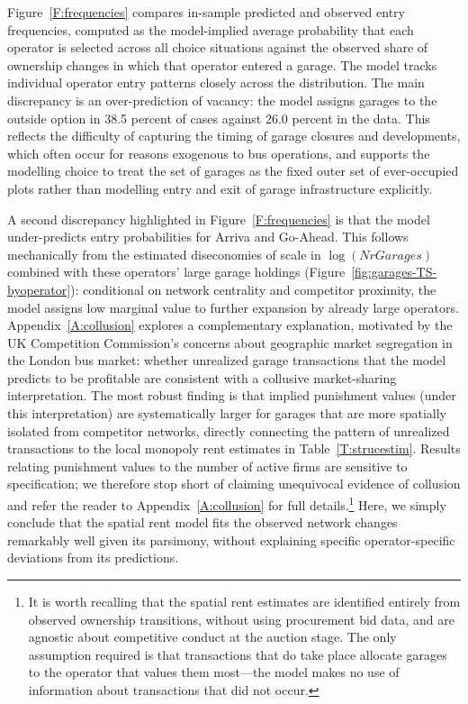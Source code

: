 \documentclass[12pt]{article}
\begin{document}
Figure~\ref{F:frequencies} compares in-sample predicted and observed entry 
frequencies, computed as the model-implied average probability that each 
operator is selected across all choice situations against the observed share 
of ownership changes in which that operator entered a garage. The model 
tracks individual operator entry patterns closely across the distribution. 
The main discrepancy is an over-prediction of vacancy: the model assigns 
garages to the outside option in 38.5 percent of cases against 26.0 percent 
in the data. This reflects the difficulty of capturing the timing of garage closures and 
developments, which often occur for reasons exogenous to bus operations, and 
supports the modelling choice to treat the set of garages as the fixed outer 
set of ever-occupied plots rather than modelling entry and exit of garage 
infrastructure explicitly.

A second discrepancy highlighted in Figure~\ref{F:frequencies} is that the model under-predicts entry probabilities 
for Arriva and Go-Ahead. This follows mechanically from the estimated 
diseconomies of scale in $\log(\textit{NrGarages})$ combined with these 
operators' large garage holdings (Figure~\ref{fig:garages-TS-byoperator}): 
conditional on network centrality and competitor proximity, the model 
assigns low marginal value to further expansion by already large operators. 
Appendix~\ref{A:collusion} explores a complementary explanation, motivated 
by the UK Competition Commission's concerns about geographic market 
segregation in the London bus market: whether unrealized garage transactions 
that the model predicts to be profitable are consistent with a collusive 
market-sharing interpretation. The most robust finding is that implied 
punishment values (under this interpretation) are systematically larger for garages that are more 
spatially isolated from competitor networks, directly connecting the pattern 
of unrealized transactions to the local monopoly rent estimates in 
Table~\ref{T:strucestim}. Results relating punishment values to the number 
of active firms are sensitive to specification; we therefore stop short of 
claiming unequivocal evidence of collusion and refer the reader to 
Appendix~\ref{A:collusion} for full details.\footnote{It is worth recalling that the spatial rent estimates are 
identified entirely from observed ownership transitions, without using 
procurement bid data, and are agnostic about competitive conduct at the 
auction stage. The only assumption required is that transactions that do 
take place allocate garages to the operator that values them most---the 
model makes no use of information about transactions that did not occur.} Here, we simply conclude that the spatial rent model fits the observed network changes remarkably well given its parsimony, without explaining specific operator-specific deviations from 
its predictions.
\end{document}
